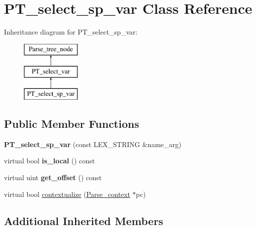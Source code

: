 \hypertarget{classPT__select__sp__var}{}\section{P\+T\+\_\+select\+\_\+sp\+\_\+var Class Reference}
\label{classPT__select__sp__var}
Inheritance diagram for P\+T\+\_\+select\+\_\+sp\+\_\+var\+:\begin{figure}[H]
\begin{center}
\leavevmode
\includegraphics[height=3.000000cm]{classPT__select__sp__var}
\end{center}
\end{figure}
\subsection*{Public Member Functions}
\begin{DoxyCompactItemize}
\item 
\mbox{\label{classPT__select__sp__var_a2fbb478d2bd813d3d1ad6d3cba25966a}} 
{\bfseries P\+T\+\_\+select\+\_\+sp\+\_\+var} (const L\+E\+X\+\_\+\+S\+T\+R\+I\+NG \&name\+\_\+arg)
\item 
\mbox{\label{classPT__select__sp__var_a3e516ffc4c408fb5778e045533ef984b}} 
virtual bool {\bfseries is\+\_\+local} () const
\item 
\mbox{\label{classPT__select__sp__var_ad6f8d32eb5d9f84a4ecc291a5cb3fb48}} 
virtual uint {\bfseries get\+\_\+offset} () const
\item 
virtual bool \mbox{\hyperlink{classPT__select__sp__var_ab4e2e87225264b63c7f099ca221a8e01}{contextualize}} (\mbox{\hyperlink{structParse__context}{Parse\+\_\+context}} $\ast$pc)
\end{DoxyCompactItemize}
\subsection*{Additional Inherited Members}


